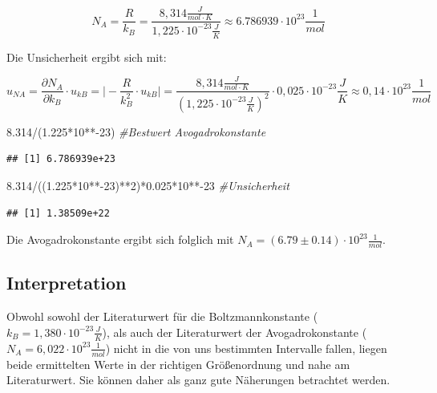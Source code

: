 \documentclass[
  9pt,
]{article}
\newenvironment{Shaded}{\begin{snugshade}}{\end{snugshade}}
\newcommand{\CommentTok}[1]{\textcolor[rgb]{0.56,0.35,0.01}{\textit{#1}}}
\newcommand{\DecValTok}[1]{\textcolor[rgb]{0.00,0.00,0.81}{#1}}
\newcommand{\FloatTok}[1]{\textcolor[rgb]{0.00,0.00,0.81}{#1}}
\newcommand{\NormalTok}[1]{#1}
\newcommand{\SpecialCharTok}[1]{\textcolor[rgb]{0.00,0.00,0.00}{#1}}
\begin{document}
\begin{equation*}
N_A = \frac{R}{k_B} = \frac{8,314 \frac{J}{mol\cdot K}}{1,225 \cdot 10^{-23} \frac{J}{K}} \approx 6.786939\cdot 10^{23} \frac{1}{mol}
\end{equation*}

Die Unsicherheit ergibt sich mit:

\begin{equation*}
u_{NA}= \frac {\partial N_A}{\partial k_B} \cdot u_{kB} 
= \vert - \frac{R}{k_B^2} \cdot u_{kB}\vert 
= \frac{8,314 \frac{J}{mol\cdot K}}{(1,225 \cdot 10^{-23} \frac{J}{K})^2} \cdot 0,025 \cdot 10^{-23} \frac{J}{K} \approx 0,14 \cdot 10^{23} \frac{1}{mol}
\end{equation*}

\begin{Shaded}
\begin{Highlighting}[]
\FloatTok{8.314}\SpecialCharTok{/}\NormalTok{(}\FloatTok{1.225}\SpecialCharTok{*}\DecValTok{10}\SpecialCharTok{**{-}}\DecValTok{23}\NormalTok{) }\CommentTok{\#Bestwert Avogadrokonstante}
\end{Highlighting}
\end{Shaded}

\begin{verbatim}
## [1] 6.786939e+23
\end{verbatim}

\begin{Shaded}
\begin{Highlighting}[]
\FloatTok{8.314}\SpecialCharTok{/}\NormalTok{((}\FloatTok{1.225}\SpecialCharTok{*}\DecValTok{10}\SpecialCharTok{**{-}}\DecValTok{23}\NormalTok{)}\SpecialCharTok{**}\DecValTok{2}\NormalTok{)}\SpecialCharTok{*}\FloatTok{0.025}\SpecialCharTok{*}\DecValTok{10}\SpecialCharTok{**{-}}\DecValTok{23} \CommentTok{\#Unsicherheit}
\end{Highlighting}
\end{Shaded}

\begin{verbatim}
## [1] 1.38509e+22
\end{verbatim}

Die Avogadrokonstante ergibt sich folglich mit
\(N_A = (6.79 \pm 0.14) \cdot 10^{23} \frac{1}{mol}\).

\hypertarget{interpretation}{%
\subsection{Interpretation}\label{interpretation}}

Obwohl sowohl der Literaturwert für die Boltzmannkonstante
(\(k_B = 1,380 \cdot 10^{-23} \frac{J}{K}\)), als auch der Literaturwert
der Avogadrokonstante (\(N_A = 6,022 \cdot 10^{23} \frac{1}{mol}\))
nicht in die von uns bestimmten Intervalle fallen, liegen beide
ermittelten Werte in der richtigen Größenordnung und nahe am
Literaturwert. Sie können daher als ganz gute Näherungen betrachtet
werden.
\end{document}
